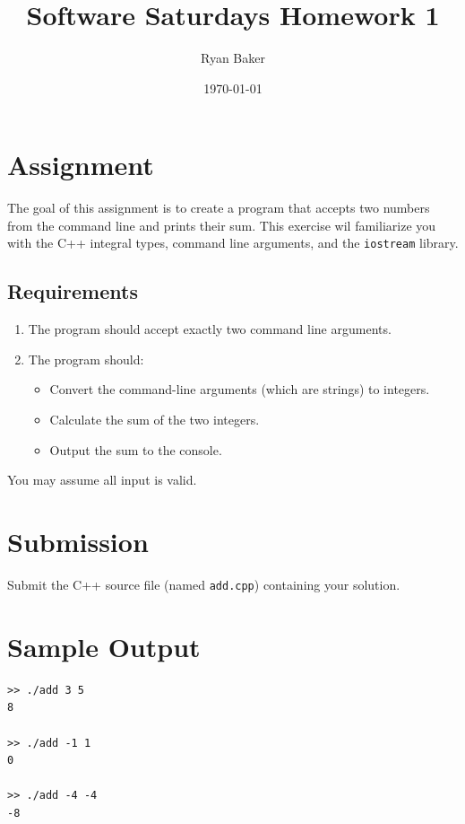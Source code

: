 \documentclass{article}
\title{Software Saturdays Homework 1}
\author{Ryan Baker}
\date{\today}
\begin{document}
\maketitle

\section*{Assignment}

\noindent
The goal of this assignment is to create a program that accepts two numbers from the command line and prints their sum. This exercise wil familiarize you with the C++ integral types, command line arguments, and the \texttt{iostream} library.

\subsection*{Requirements}

\begin{enumerate}
	\item The program should accept exactly two command line arguments.
	\item The program should:
	\begin{itemize}
		\item Convert the command-line arguments (which are strings) to integers.
		\item Calculate the sum of the two integers.
		\item Output the sum to the console.
	\end{itemize}
\end{enumerate}

\noindent
You may assume all input is valid.

\section*{Submission}

\noindent
Submit the C++ source file (named \texttt{add.cpp}) containing your solution.

\section*{Sample Output}

\begin{verbatim}
>> ./add 3 5
8

>> ./add -1 1
0

>> ./add -4 -4
-8
\end{verbatim}
\end{document}

